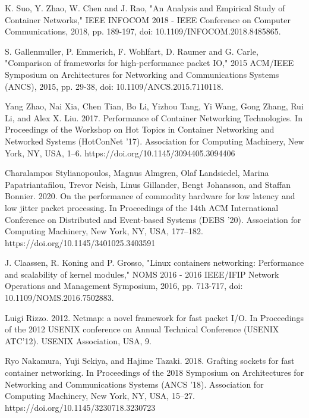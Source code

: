 \documentclass[conference]{IEEEtran}
\begin{document}
\begin{thebibliography}{1}

K. Suo, Y. Zhao, W. Chen and J. Rao, "An Analysis and Empirical Study of Container Networks," IEEE INFOCOM 2018 - IEEE Conference on Computer Communications, 2018, pp. 189-197, doi: 10.1109/INFOCOM.2018.8485865.

S. Gallenmuller, P. Emmerich, F. Wohlfart, D. Raumer and G. Carle, "Comparison of frameworks for high-performance packet IO," 2015 ACM/IEEE Symposium on Architectures for Networking and Communications Systems (ANCS), 2015, pp. 29-38, doi: 10.1109/ANCS.2015.7110118.

Yang Zhao, Nai Xia, Chen Tian, Bo Li, Yizhou Tang, Yi Wang, Gong Zhang, Rui Li, and Alex X. Liu. 2017. Performance of Container Networking Technologies. In Proceedings of the Workshop on Hot Topics in Container Networking and Networked Systems (HotConNet '17). Association for Computing Machinery, New York, NY, USA, 1–6. https://doi.org/10.1145/3094405.3094406

Charalampos Stylianopoulos, Magnus Almgren, Olaf Landsiedel, Marina Papatriantafilou, Trevor Neish, Linus Gillander, Bengt Johansson, and Staffan Bonnier. 2020. On the performance of commodity hardware for low latency and low jitter packet processing. In Proceedings of the 14th ACM International Conference on Distributed and Event-based Systems (DEBS '20). Association for Computing Machinery, New York, NY, USA, 177–182. https://doi.org/10.1145/3401025.3403591

J. Claassen, R. Koning and P. Grosso, "Linux containers networking: Performance and scalability of kernel modules," NOMS 2016 - 2016 IEEE/IFIP Network Operations and Management Symposium, 2016, pp. 713-717, doi: 10.1109/NOMS.2016.7502883.

Luigi Rizzo. 2012. Netmap: a novel framework for fast packet I/O. In Proceedings of the 2012 USENIX conference on Annual Technical Conference (USENIX ATC'12). USENIX Association, USA, 9.

Ryo Nakamura, Yuji Sekiya, and Hajime Tazaki. 2018. Grafting sockets for fast container networking. In Proceedings of the 2018 Symposium on Architectures for Networking and Communications Systems (ANCS '18). Association for Computing Machinery, New York, NY, USA, 15–27. https://doi.org/10.1145/3230718.3230723


\end{thebibliography}
\end{document}
